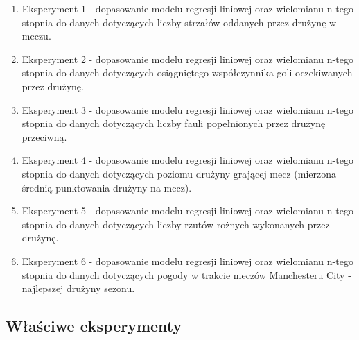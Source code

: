 \documentclass[11pt]{article}
\begin{document}
\begin{enumerate}[label=\alph*)]
  \item Eksperyment 1 - dopasowanie modelu regresji liniowej oraz wielomianu n-tego stopnia do danych dotyczących liczby strzałów oddanych przez drużynę w meczu.
  \item Eksperyment 2 - dopasowanie modelu regresji liniowej oraz wielomianu n-tego stopnia do danych dotyczących osiągniętego współczynnika goli oczekiwanych przez drużynę. 
  \item Eksperyment 3 - dopasowanie modelu regresji liniowej oraz wielomianu n-tego stopnia do danych dotyczących liczby fauli popełnionych przez drużynę przeciwną.
  \item Eksperyment 4 - dopasowanie modelu regresji liniowej oraz wielomianu n-tego stopnia do danych dotyczących poziomu drużyny grającej mecz (mierzona średnią punktowania drużyny na mecz). 
  \item Eksperyment 5 - dopasowanie modelu regresji liniowej oraz wielomianu n-tego stopnia do danych dotyczących liczby rzutów rożnych wykonanych przez drużynę.
  \item Eksperyment 6 - dopasowanie modelu regresji liniowej oraz wielomianu n-tego stopnia do danych dotyczących pogody w trakcie meczów Manchesteru City - najlepszej drużyny sezonu.
\end{enumerate}
\newpage
\subsection{Właściwe eksperymenty}
\end{document}
